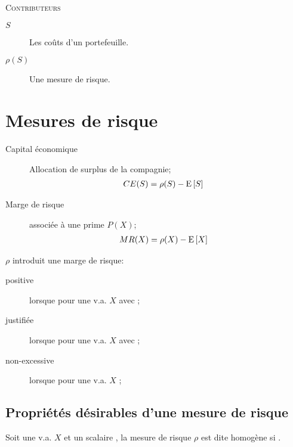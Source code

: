 \documentclass[10pt, french]{article}
\begin{document}
\begin{center}
	\textsc{\Large Contributeurs}\\[0.5cm] 
\end{center}
%

\newpage

\raggedcolumns
\begin{multicols*}{2} 

\begin{distributions}[Notation]
\begin{description}
	\item[$S$]	Les coûts d'un portefeuille.
	\item[$\rho(S)$]	Une mesure de risque.
\end{description}
\end{distributions}

\section{Mesures de risque}

\begin{description}
	\item[Capital économique]	Allocation de surplus de la compagnie;
		\begin{align*}
		CE(S)	
		&=	\rho(S)	-	\mathrm{E} \left[ S \right]
		\end{align*}
	\item[Marge de risque]	associée à une prime $P(X)$;
		\begin{align*}
		MR(X)
		&=	\rho(X)	-	\mathrm{E} \left[ X \right]
		\end{align*}
\end{description}

$\rho$ introduit une marge de risque:
\begin{description}
	\item[positive]	lorsque  pour une v.a. $X$ avec ;
	\item[justifiée]	lorsque  pour une v.a. $X$ avec ;
	\item[non-excessive]	lorsque  pour une v.a. $X$  ;
\end{description}

\subsection{Propriétés désirables d'une mesure de risque}
\begin{definitionNOHFILLsub}[Homogénéité]
Soit une v.a. $X$ et un scalaire , la mesure de risque $\rho$ est dite homogène si .
\end{definitionNOHFILLsub}


\end{multicols*}
\end{document}
